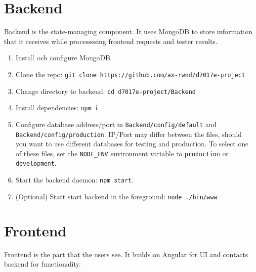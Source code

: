\section{Backend}
Backend is the state-managing component. It uses MongoDB to store information that it receives while processesing frontend requests and tester results.
\begin{enumerate}
\item Install och configure MongoDB.
\item Clone the repo: \texttt{git clone https://github.com/ax-rwnd/d7017e-project}
\item Change directory to backend: \texttt{cd d7017e-project/Backend}
\item Install dependencies: \texttt{npm i}
\item Configure database address/port in \texttt{Backend/config/default} and \\
\texttt{Backend/config/production}. IP/Port may differ between the files, should you want to use different databases for testing and production. To select one of these files, set the \texttt{NODE\_ENV} environment variable to \texttt{production} or \texttt{development}.
\item Start the backend daemon: \texttt{npm start}.
\item (Optional) Start start backend in the foreground: \texttt{node ./bin/www}
\end{enumerate}

\section{Frontend}
Frontend is the part that the users see. It builds on Angular for UI and contacts backend for functionality.

